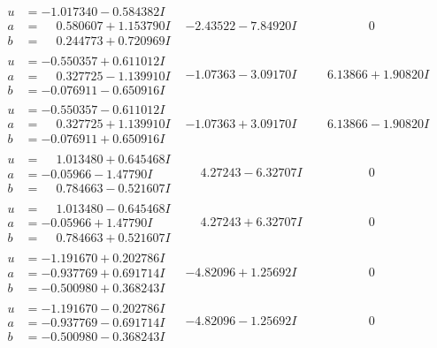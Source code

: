 \documentclass[1p]{elsarticle_modified}
\theoremstyle{definition}
\begin{document}
$$\begin{array}{c|c|c}
\begin{aligned}
u &= -1.017340 - 0.584382 I \\
a &= \phantom{-}0.580607 + 1.153790 I \\
b &= \phantom{-}0.244773 + 0.720969 I\end{aligned}
 & -2.43522 - 7.84920 I & \phantom{-0.000000 } 0 \\ \hline\begin{aligned}
u &= -0.550357 + 0.611012 I \\
a &= \phantom{-}0.327725 - 1.139910 I \\
b &= -0.076911 - 0.650916 I\end{aligned}
 & -1.07363 - 3.09170 I & \phantom{-}6.13866 + 1.90820 I \\ \hline\begin{aligned}
u &= -0.550357 - 0.611012 I \\
a &= \phantom{-}0.327725 + 1.139910 I \\
b &= -0.076911 + 0.650916 I\end{aligned}
 & -1.07363 + 3.09170 I & \phantom{-}6.13866 - 1.90820 I \\ \hline\begin{aligned}
u &= \phantom{-}1.013480 + 0.645468 I \\
a &= -0.05966 - 1.47790 I \\
b &= \phantom{-}0.784663 - 0.521607 I\end{aligned}
 & \phantom{-}4.27243 - 6.32707 I & \phantom{-0.000000 } 0 \\ \hline\begin{aligned}
u &= \phantom{-}1.013480 - 0.645468 I \\
a &= -0.05966 + 1.47790 I \\
b &= \phantom{-}0.784663 + 0.521607 I\end{aligned}
 & \phantom{-}4.27243 + 6.32707 I & \phantom{-0.000000 } 0 \\ \hline\begin{aligned}
u &= -1.191670 + 0.202786 I \\
a &= -0.937769 + 0.691714 I \\
b &= -0.500980 + 0.368243 I\end{aligned}
 & -4.82096 + 1.25692 I & \phantom{-0.000000 } 0 \\ \hline\begin{aligned}
u &= -1.191670 - 0.202786 I \\
a &= -0.937769 - 0.691714 I \\
b &= -0.500980 - 0.368243 I\end{aligned}
 & -4.82096 - 1.25692 I & \phantom{-0.000000 } 0\\

\end{array}$$
\end{document}
